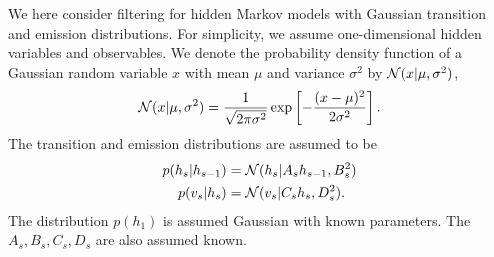 \label{ex:kalman}

We here consider filtering for hidden Markov models with Gaussian
transition and emission distributions. For simplicity, we assume
one-dimensional hidden variables and observables. We denote the
probability density function of a Gaussian random variable $x$ with
mean $\mu$ and variance $\sigma^2$ by $\mathcal{N}(x | \mu, \sigma^2)$,
\begin{equation}
  \mathcal{N}(x | \mu, \sigma^2) = \frac{1}{\sqrt{2 \pi \sigma^2}} \exp\left[ -\frac{(x-\mu)^2}{2\sigma^2} \right].
\end{equation}
The transition and emission distributions are assumed to be
\begin{align}
  p(h_s | h_{s-1}) &= \mathcal{N}(h_s | A_s h_{s-1}, B^2_s) \label{eq:transition}\\
  p(v_s | h_s) & = \mathcal{N}(v_s | C_s h_s, D^2_s). \label{eq:emission}
\end{align}
The distribution $p(h_1)$ is assumed Gaussian with known
parameters. The $A_s, B_s, C_s, D_s$ are also assumed known.


